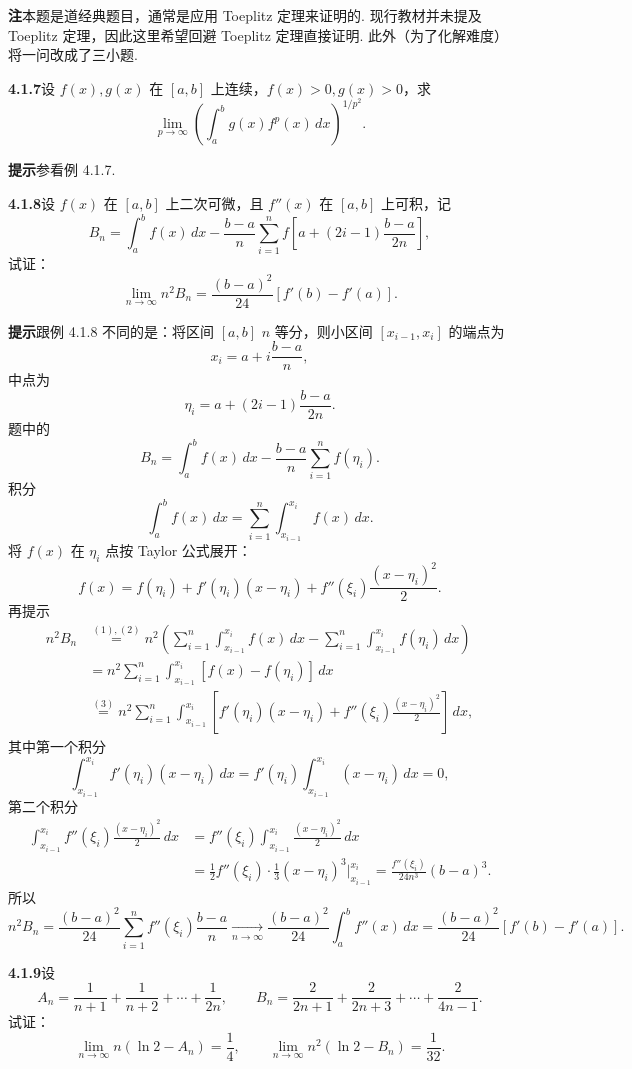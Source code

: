 \documentclass[UTF8, 12pt, fontset=fandol, oneside]{ctexart}
\begin{document}
\noindent\textbf{注}\quad 本题是道经典题目，通常是应用 Toeplitz 定理来证明的. 现行教材并未提及 Toeplitz 定理，因此这里希望回避 Toeplitz 定理直接证明. 此外（为了化解难度）将一问改成了三小题.

\noindent\textbf{4.1.7}\quad 设 $f(x),g(x)$ 在 $[a,b]$ 上连续，$f(x)>0,g(x)>0$，求
\[
\lim_{p\to\infty}\left(\int_a^b g(x)f^p(x)\,dx\right)^{1/p^2}.
\]

\noindent\textbf{提示}\quad 参看例 4.1.7.

\noindent\textbf{4.1.8}\quad 设 $f(x)$ 在 $[a,b]$ 上二次可微，且 $f''(x)$ 在 $[a,b]$ 上可积，记
\[
B_n=\int_a^b f(x)\,dx-\frac{b-a}{n}
\sum_{i=1}^n f\left[a+(2i-1)\frac{b-a}{2n}\right],
\]
试证：
\[
\lim_{n\to\infty}n^2B_n
=\frac{(b-a)^2}{24}[f'(b)-f'(a)].
\]

\noindent\textbf{提示}\quad 跟例 4.1.8 不同的是：将区间 $[a,b]$ $n$ 等分，则小区间 $[x_{i-1},x_i]$ 的端点为
\[
x_i=a+i\frac{b-a}{n},
\]
中点为
\[
\eta_i=a+(2i-1)\frac{b-a}{2n}.
\]
题中的
\[
B_n=\int_a^b f(x)\,dx-\frac{b-a}{n}\sum_{i=1}^n f(\eta_i).
\tag{1}
\]
积分
\[
\int_a^b f(x)\,dx=\sum_{i=1}^n\int_{x_{i-1}}^{x_i}f(x)\,dx.
\tag{2}
\]
将 $f(x)$ 在 $\eta_i$ 点按 Taylor 公式展开：
\[
f(x)=f(\eta_i)+f'(\eta_i)(x-\eta_i)
+f''(\xi_i)\frac{(x-\eta_i)^2}{2}.
\tag{3}
\]
再提示
\[
\begin{aligned}
n^2B_n
&\stackrel{(1),(2)}{=}
n^2\left(\sum_{i=1}^n\int_{x_{i-1}}^{x_i}f(x)\,dx
-\sum_{i=1}^n\int_{x_{i-1}}^{x_i}f(\eta_i)\,dx\right)\\
&=n^2\sum_{i=1}^n\int_{x_{i-1}}^{x_i}[f(x)-f(\eta_i)]\,dx\\
&\stackrel{(3)}{=}
n^2\sum_{i=1}^n\int_{x_{i-1}}^{x_i}
\left[f'(\eta_i)(x-\eta_i)+f''(\xi_i)\frac{(x-\eta_i)^2}{2}\right]\,dx,
\end{aligned}
\]
其中第一个积分
\[
\int_{x_{i-1}}^{x_i}f'(\eta_i)(x-\eta_i)\,dx
=f'(\eta_i)\int_{x_{i-1}}^{x_i}(x-\eta_i)\,dx=0,
\]
第二个积分
\[
\begin{aligned}
\int_{x_{i-1}}^{x_i}f''(\xi_i)\frac{(x-\eta_i)^2}{2}\,dx
&=f''(\xi_i)\int_{x_{i-1}}^{x_i}\frac{(x-\eta_i)^2}{2}\,dx\\
&=\frac12f''(\xi_i)\cdot\frac13(x-\eta_i)^3\bigg|_{x_{i-1}}^{x_i}
=\frac{f''(\xi_i)}{24n^3}(b-a)^3.
\end{aligned}
\]
所以
\[
n^2B_n=\frac{(b-a)^2}{24}
\sum_{i=1}^n f''(\xi_i)\frac{b-a}{n}
\xrightarrow[n\to\infty]{}
\frac{(b-a)^2}{24}\int_a^b f''(x)\,dx
=\frac{(b-a)^2}{24}[f'(b)-f'(a)].
\]

\noindent\textbf{4.1.9}\quad 设
\[
A_n=\frac1{n+1}+\frac1{n+2}+\cdots+\frac1{2n},\qquad
B_n=\frac2{2n+1}+\frac2{2n+3}+\cdots+\frac2{4n-1}.
\]
试证：
\[
\lim_{n\to\infty}n(\ln2-A_n)=\frac14,\qquad
\lim_{n\to\infty}n^2(\ln2-B_n)=\frac1{32}.
\]
\end{document}
